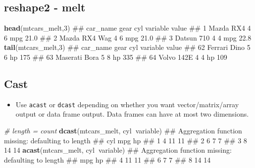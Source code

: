 \documentclass[]{article}
\newenvironment{Shaded}{\begin{snugshade}}{\end{snugshade}}
\newcommand{\KeywordTok}[1]{\textcolor[rgb]{0.13,0.29,0.53}{\textbf{#1}}}
\newcommand{\DataTypeTok}[1]{\textcolor[rgb]{0.13,0.29,0.53}{#1}}
\newcommand{\DecValTok}[1]{\textcolor[rgb]{0.00,0.00,0.81}{#1}}
\newcommand{\StringTok}[1]{\textcolor[rgb]{0.31,0.60,0.02}{#1}}
\newcommand{\CommentTok}[1]{\textcolor[rgb]{0.56,0.35,0.01}{\textit{#1}}}
\newcommand{\OperatorTok}[1]{\textcolor[rgb]{0.81,0.36,0.00}{\textbf{#1}}}
\newcommand{\NormalTok}[1]{#1}
\providecommand{\tightlist}{%
  \setlength{\itemsep}{0pt}\setlength{\parskip}{0pt}}
\begin{document}
\begin{Shaded}
\end{Shaded}

\subsection{reshape2 - melt}\label{reshape2---melt-1}

\begin{Shaded}
\begin{Highlighting}[]
\KeywordTok{head}\NormalTok{(mtcars_melt,}\DecValTok{3}\NormalTok{)}
\NormalTok{##        car_name gear cyl variable value}
\NormalTok{## 1     Mazda RX4    4   6      mpg  21.0}
\NormalTok{## 2 Mazda RX4 Wag    4   6      mpg  21.0}
\NormalTok{## 3    Datsun 710    4   4      mpg  22.8}
\KeywordTok{tail}\NormalTok{(mtcars_melt,}\DecValTok{3}\NormalTok{)}
\NormalTok{##         car_name gear cyl variable value}
\NormalTok{## 62  Ferrari Dino    5   6       hp   175}
\NormalTok{## 63 Maserati Bora    5   8       hp   335}
\NormalTok{## 64    Volvo 142E    4   4       hp   109}
\end{Highlighting}
\end{Shaded}

\subsection{Cast}\label{cast}

\begin{itemize}
\tightlist
\item
  Use \texttt{acast} or \texttt{dcast} depending on whether you want
  vector/matrix/array output or data frame output. Data frames can have
  at most two dimensions.
\end{itemize}

\begin{Shaded}
\begin{Highlighting}[]
\CommentTok{# length = count}
\KeywordTok{dcast}\NormalTok{(mtcars_melt, cyl}\OperatorTok{~}\NormalTok{variable)}
\NormalTok{## Aggregation function missing: defaulting to length}
\NormalTok{##   cyl mpg hp}
\NormalTok{## 1   4  11 11}
\NormalTok{## 2   6   7  7}
\NormalTok{## 3   8  14 14}
\KeywordTok{acast}\NormalTok{(mtcars_melt, cyl}\OperatorTok{~}\NormalTok{variable)}
\NormalTok{## Aggregation function missing: defaulting to length}
\NormalTok{##   mpg hp}
\NormalTok{## 4  11 11}
\NormalTok{## 6   7  7}
\NormalTok{## 8  14 14}
\end{Highlighting}
\end{Shaded}
\end{document}
